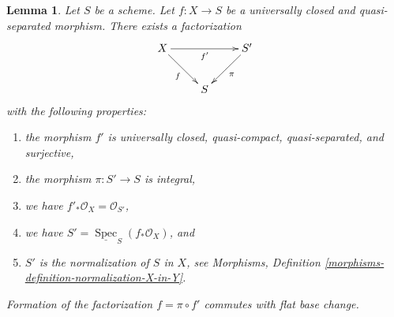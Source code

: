 \documentclass{amsart}
\theoremstyle{plain}
\newtheorem{lemma}[subsection]{Lemma}
\theoremstyle{definition}
\theoremstyle{remark}
\numberwithin{equation}{subsection}
\def\Spec{\mathop{\mathrm{Spec}}}
\begin{document}
\begin{lemma}
\label{lemma-stein-universally-closed}
Let $S$ be a scheme. Let $f : X \to S$ be a universally closed and
quasi-separated morphism. There exists a factorization
$$
\xymatrix{
X \ar[rr]_{f'} \ar[rd]_f & & S' \ar[dl]^\pi \\
& S &
}
$$
with the following properties:
\begin{enumerate}
\item the morphism $f'$ is universally closed, quasi-compact, quasi-separated,
and surjective,
\item the morphism $\pi : S' \to S$ is integral,
\item we have $f'_*\mathcal{O}_X = \mathcal{O}_{S'}$,
\item we have $S' = \underline{\Spec}_S(f_*\mathcal{O}_X)$, and
\item $S'$ is the normalization of $S$ in $X$, see
Morphisms, Definition \ref{morphisms-definition-normalization-X-in-Y}.
\end{enumerate}
Formation of the factorization $f = \pi \circ f'$ commutes
with flat base change.
\end{lemma}
\end{document}
